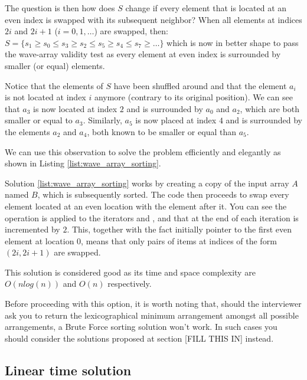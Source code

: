 The question is then how does $S$ change if every element that is located at an even index is swapped with its subsequent neighbor?
When all elements at indices $2i$ and $2i+1$ ($i=0,1,\ldots$) are swapped, then:
$S=\{s_1 \geq s_0 \leq s_3 \geq s_2 \leq s_5 \geq s_4 \leq s_7  \geq \ldots\}$ which is now in better shape to pass the wave-array validity test as every element at even index is surrounded by smaller (or equal) elements. 

Notice that the elements of $S$ have been shuffled around and that the element $a_i$ is not located at index $i$ anymore (contrary to its original position).
We can see that $a_3$ is now located at index $2$ and  is surrounded by $a_0$ and $a_2$, which are both smaller or equal to $a_3$.
Similarly, $a_5$ is now placed at index $4$ and is surrounded by the elements $a_2$ and $a_4$, both known to be smaller or equal than $a_5$.

We can use this observation to solve the problem efficiently and elegantly as shown in  Listing \ref{list:wave_array_sorting}.



Solution \ref{list:wave_array_sorting} works by creating a copy of the input array $A$ named $B$, which is subsequently sorted. The code then proceeds to swap every element located at an even location with the element after it. 
You can see the  operation is applied to the iterators  and , and that at the end of each iteration  is incremented by $2$.
This, together with the fact  initially pointer to the first even element at location $0$,  means that only pairs of items at indices of the form $(2i, 2i+1)$ are swapped.

This solution is considered good as its time and space complexity are $O(nlog(n))$
and $O(n)$ respectively.

Before proceeding with this option, it is worth noting that, should the interviewer ask you to return the lexicographical minimum arrangement amongst all possible arrangements, a Brute Force sorting solution  won't work. In such cases you should consider the solutions proposed at section [FILL THIS IN] instead. 


\subsection{Linear time solution}


